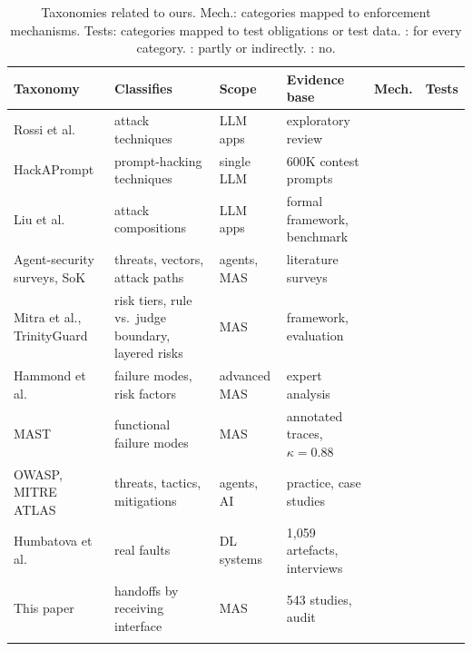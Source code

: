 \documentclass[pdflatex,sn-mathphys-num]{sn-jnl}
\theoremstyle{thmstyleone}%
\theoremstyle{thmstyletwo}%
\theoremstyle{thmstylethree}%
\newcommand{\cfull}{\usebox{\cfullbox}}
\newcommand{\chalf}{\usebox{\chalfbox}}
\newcommand{\cnone}{\usebox{\cnonebox}}
\newcommand{\NCorpus}{543}
\begin{document}
\begin{table}[tbp]
\caption{Taxonomies related to ours. Mech.: categories mapped to enforcement mechanisms. Tests: categories mapped to test obligations or test data. \cfull: for every category. \chalf: partly or indirectly. \cnone: no.}\label{tab:taxcmp}
\scriptsize\setlength{\tabcolsep}{3pt}
\begin{tabular*}{\textwidth}{@{\extracolsep\fill}L{2.75cm}L{2.55cm}L{1.75cm}L{3.0cm}cc@{}}
\toprule
Taxonomy & Classifies & Scope & Evidence base & Mech. & Tests \\
\midrule
Rossi et al. \citep{rossi2024categorization} & attack techniques & LLM apps & exploratory review & \cnone & \cnone \\\addlinespace[1.2pt]
HackAPrompt \citep{schulhoff2023hackaprompt} & prompt-hacking techniques & single LLM & 600K contest prompts & \cnone & \chalf \\\addlinespace[1.2pt]
Liu et al. \citep{liu2024formalizing} & attack compositions & LLM apps & formal framework, benchmark & \chalf & \chalf \\\addlinespace[1.2pt]
Agent-security surveys, SoK \citep{deng2025agentsthreat,Ferrag2025FromPIB,Wang2026TheLOT,Yang2026SoKWSJ} & threats, vectors, attack paths & agents, MAS & literature surveys & \chalf & \cnone \\\addlinespace[1.2pt]
Mitra et al., TrinityGuard \citep{Mitra2026WhereREC,Wang2026TrinityGuardAUF} & risk tiers, rule vs.\ judge boundary, layered risks & MAS & framework, evaluation & \chalf & \chalf \\\addlinespace[1.2pt]
Hammond et al. \citep{hammond2025multiagent} & failure modes, risk factors & advanced MAS & expert analysis & \cnone & \cnone \\\addlinespace[1.2pt]
MAST \citep{cemri2025mast} & functional failure modes & MAS & annotated traces, $\kappa = 0.88$ & \cnone & \chalf \\\addlinespace[1.2pt]
OWASP, MITRE ATLAS \citep{owasp2025agentic,mitre2025atlas} & threats, tactics, mitigations & agents, AI & practice, case studies & \chalf & \cnone \\\addlinespace[1.2pt]
Humbatova et al. \citep{humbatova2020taxonomy} & real faults & DL systems & 1,059 artefacts, interviews & \cnone & \chalf \\\addlinespace[1.2pt]
\midrule
This paper & handoffs by receiving interface & MAS & \NCorpus{} studies, audit & \cfull & \cfull \\\addlinespace[1.2pt]
\botrule
\end{tabular*}
\end{table}
\end{document}
